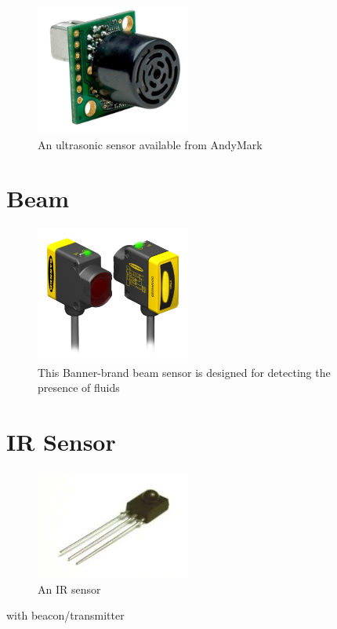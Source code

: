 \documentclass{article}
\begin{document}
\begin{figure}[ht]
\centering
\includegraphics[width=2in]{ultrasonic.jpg}
\caption{An ultrasonic sensor available from AndyMark}
\end{figure}

\section{Beam}
\begin{figure}[ht]
\centering
\includegraphics[width=2in]{beam.jpeg}
\caption{This Banner-brand beam sensor is designed for detecting the presence of fluids}
\end{figure}

\section{IR Sensor}
\begin{figure}[ht]
\centering
\includegraphics[width=2in]{ir_sensor.jpeg}
\caption{An IR sensor}
\end{figure}
with beacon/transmitter
\end{document}

